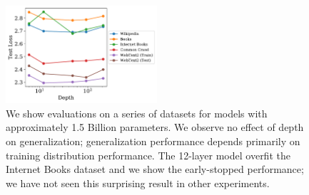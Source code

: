 \documentclass[english]{article}
\begin{document}
\begin{figure}
\noindent \centering{}
\includegraphics[width=0.5\textwidth]{DepthVsGeneralization}
\caption[Generalization versus depth]{We show evaluations on a series of datasets for models with approximately 1.5 Billion parameters.  We observe no effect of depth on generalization; generalization performance depends primarily on training distribution performance. The 12-layer model overfit the Internet Books dataset and we show the early-stopped performance; we have not seen this surprising result in other experiments. \label{fig:DepthVsGeneralization}}
\end{figure}

\listoffigures
\listoftables



\end{document}

